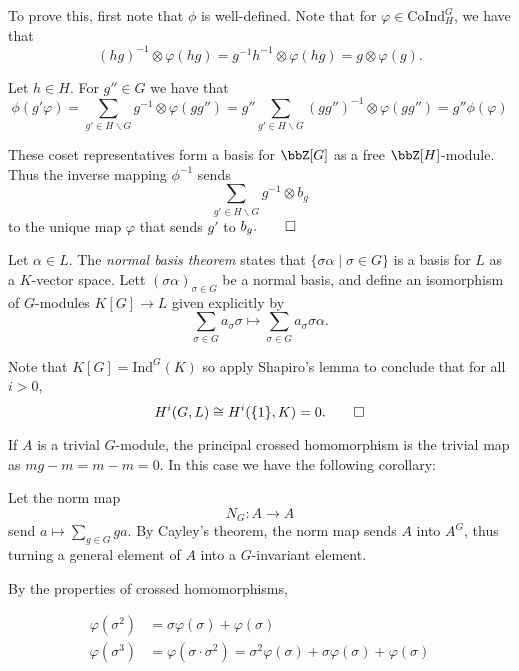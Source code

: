 \documentclass[a4paper, 12pt,oneside,openany]{book}
\begin{document}
To prove this, first note that $\phi$ is well-defined. Note that for $\varphi \in \text{CoInd}_H^G$, we have that $$(hg)^{-1} \otimes \varphi(hg) = g^{-1} h^{-1} \otimes \varphi(hg) = g \otimes \varphi(g).$$

Let $h \in H$. For $g'' \in G$ we have that $$\phi(g'\varphi) =\sum\limits_{g' \in H \backslash G} g^{-1} \otimes \varphi(gg'')= g'' \sum\limits_{g' \in H \backslash G} (gg'')^{-1} \otimes \varphi(gg'') = g''\phi(\varphi)$$

These coset representatives form a basis for $\bbZ[G]$ as a free $\bbZ[H]$-module. Thus the inverse mapping $\phi^{-1}$ sends $$\sum\limits_{g' \in H \backslash G} g^{-1} \otimes b_g$$ to the unique map $\varphi$ that sends $g'$ to $b_g. \qed$


 Let $\alpha \in L$. The \emph{normal basis theorem} states that $\{\sigma \alpha \mid \sigma \in G\}$ is a basis for $L$ as a $K$-vector space. Lett $(\sigma\alpha)_{\sigma \in G}$ be a normal basis, and define an isomorphism of $G$-modules $K[G] \to L$ given explicitly by $$\sum\limits_{\sigma \in G} a_\sigma \sigma \mapsto \sum\limits_{\sigma \in G} a_\sigma \sigma \alpha.$$

Note that $K[G] = \text{Ind}^G(K)$ so apply Shapiro's lemma to conclude that for all $i>0$, $$H^i(G, L) \cong H^i(\{1\}, K)=0. \qed$$

If $A$ is a trivial $G$-module, the principal crossed homomorphism is the trivial map as $mg-m = m-m=0$. In this case we have the following corollary:


Let the norm map $$N_G: A\to A$$ send $a \mapsto \sum\limits_{g \in G} ga$. By Cayley's theorem, the norm map sends $A$ into $A^G$, thus turning a general element of $A$ into a $G$-invariant element. 


 By the properties of crossed homomorphisms, 

\begin{align*} 
	\varphi(\sigma^2) &= \sigma \varphi(\sigma)+\varphi(\sigma) \\
	\varphi(\sigma^3) &= \varphi(\sigma \cdot \sigma^2)= \sigma^2 \varphi(\sigma)+\sigma\varphi(\sigma)+\varphi(\sigma) 
\end{align*}
\end{document}
